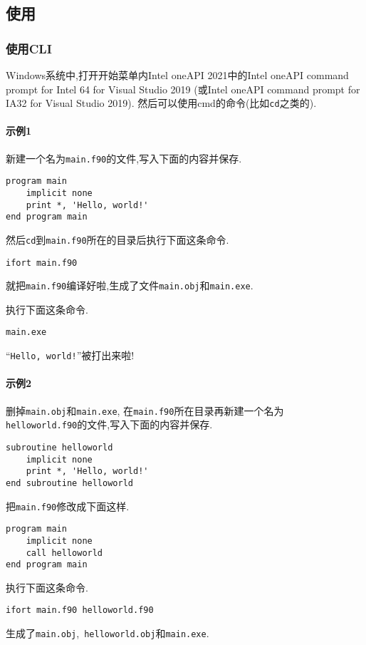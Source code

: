 \subsection{使用}\label{use_ifort}

\subsubsection{使用CLI}

Windows系统中,打开开始菜单内Intel oneAPI 2021中的Intel oneAPI command prompt for Intel 64 for Visual Studio 2019 (或Intel oneAPI command prompt for IA32 for Visual Studio 2019). 然后可以使用cmd的命令(比如\verb|cd|之类的).

\paragraph{示例1}
新建一个名为\verb|main.f90|的文件,写入下面的内容并保存.
\begin{verbatim}
program main
    implicit none
    print *, 'Hello, world!'
end program main
\end{verbatim}

然后\verb|cd|到\verb|main.f90|所在的目录后执行下面这条命令.
\begin{verbatim}
ifort main.f90
\end{verbatim}
就把\verb|main.f90|编译好啦,生成了文件\verb|main.obj|和\verb|main.exe|.

执行下面这条命令.
\begin{verbatim}
main.exe
\end{verbatim}
``\verb|Hello, world!|''被打出来啦!

\paragraph{示例2}
删掉\verb|main.obj|和\verb|main.exe|, 在\verb|main.f90|所在目录再新建一个名为\\\verb|helloworld.f90|的文件,写入下面的内容并保存.
\begin{verbatim}
subroutine helloworld
    implicit none
    print *, 'Hello, world!'
end subroutine helloworld
\end{verbatim}

把\verb|main.f90|修改成下面这样.
\begin{verbatim}
program main
    implicit none
    call helloworld
end program main
\end{verbatim}

执行下面这条命令.
\begin{verbatim}
ifort main.f90 helloworld.f90
\end{verbatim}
生成了\verb|main.obj|,~\verb|helloworld.obj|和\verb|main.exe|.


